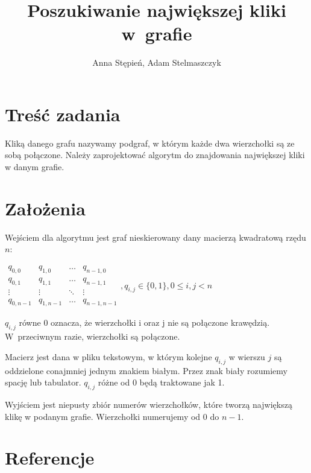 \documentclass[12pt, a4paper]{article}
\title{\textbf{Poszukiwanie największej kliki w~grafie}}
\author{Anna Stępień, Adam Stelmaszczyk}
\date{}
\begin{document}
\maketitle
\setlength{\parindent}{0in}
\section{Treść zadania}

Kliką danego grafu nazywamy podgraf, w którym każde dwa wierzchołki są ze sobą połączone. 
Należy zaprojektować algorytm do znajdowania największej kliki w danym grafie.

\section{Założenia}

Wejściem dla algorytmu jest graf nieskierowany dany macierzą kwadratową rzędu $n$:

\bigskip
$ 
\begin{array}{cccc}
q_{0,0} & q_{1,0} & \ldots & q_{n-1,0} \\
q_{0,1} & q_{1,1} & \ldots & q_{n-1,1} \\
\vdots  & \vdots  & \ddots & \vdots  \\
q_{0,n-1} & q_{1,n-1} & \ldots & q_{n-1,n-1} 
\end{array}
, q_{i,j} \in \{0,1\}, 0 \leq i,j < n
$
\bigskip

$q_{i,j}$ równe 0 oznacza, że wierzchołki i oraz j nie są połączone krawędzią. W~przeciwnym razie, wierzchołki są połączone.
\par\vspace{\baselineskip}
Macierz jest dana w pliku tekstowym, w którym kolejne $q_{i,j}$ w wierszu $j$ są oddzielone conajmniej jednym znakiem białym. 
Przez znak biały rozumiemy spację lub tabulator. $q_{i,j}$ różne od 0 będą traktowane jak 1.
\par\vspace{\baselineskip}
Wyjściem jest niepusty zbiór numerów wierzchołków, które tworzą największą klikę w podanym grafie. 
Wierzchołki numerujemy od 0 do $n-1$.

\section{Referencje}
\end{document}
